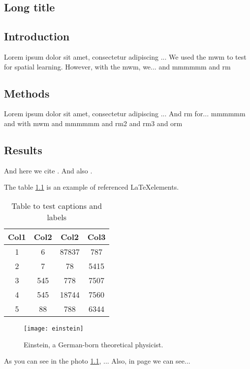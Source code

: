 \begin{refsection} %
\chapter[Short title]{Long title}

\section{Introduction}
Lorem ipsum dolor sit amet, consectetur adipiscing ...
We used the \acrfull{mwm} to test for spatial learning. However, with the \acrshort{mwm}, we... and \acrshort{mmmmmm} and \acrshort{rm}
\section{Methods}
Lorem ipsum dolor sit amet, consectetur adipiscing ... And \acrfull{rm} for... \acrfull{mmmmmm} and with \acrshort{mwm}
and \acrlong{mmmmmm} and \acrshort{rm2} and \acrshort{rm3} and \acrshort{orm}
\section{Results} 
And here we cite \cite{Famoye2015}. And also \citeauthor{Famoye2015}. 

The table \ref{table:1} is an example of referenced \LaTeX elements.

\begin{table}[h!]
	\centering
	\begin{tabular}{||c c c c||} 
		\hline
		Col1 & Col2 & Col2 & Col3 \\ [0.5ex] 
		\hline\hline
		1 & 6 & 87837 & 787 \\ 
		2 & 7 & 78 & 5415 \\
		3 & 545 & 778 & 7507 \\
		4 & 545 & 18744 & 7560 \\
		5 & 88 & 788 & 6344 \\ [1ex] 
		\hline
	\end{tabular}
	\caption{Table to test captions and labels}
	\label{table:1}
\end{table}

\begin{figure}[ht]
	\centering
	\texttt{[image: einstein]}
	\caption[Einstein]{Einstein, a German-born theoretical physicist.}
	\centering
	\label{fig:1}
\end{figure}

As you can see in the photo \ref{fig:1}, ... Also, in page \pageref{fig:1}  we can see...


\end{refsection}
